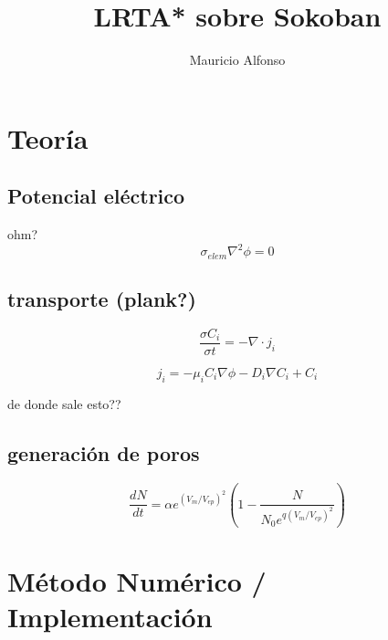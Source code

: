 \documentclass[a4paper,10pt]{article}
\title{LRTA* sobre Sokoban}
\author{Mauricio Alfonso}
\begin{document}
\maketitle

\begin{abstract}

\end{abstract}


\section{Teoría}

\subsection{Potencial eléctrico}

ohm?\\

\begin{equation}
	\sigma_{elem} \nabla^{2} \phi = 0 
\end{equation}

\subsection{transporte (plank?)}

\begin{equation}
	\frac{\sigma C_i}{\sigma t} = -\nabla \cdot j_i
\end{equation}

\begin{equation}
	j_i = -\mu_i C_i \nabla \phi - D_i \nabla C_i + C_i
\end{equation}

de donde sale esto??

\subsection{generación de poros}
\begin{equation}
	\frac{dN}{dt} = \alpha e^{(V_m/V_{ep})^2} \left( 1 - \frac{N}{N_0 e^{q \left(V_m/V_{ep} \right) ^2}} \right)
\end{equation}



\section{Método Numérico / Implementación}
\end{document}
